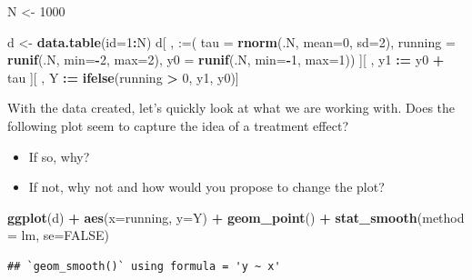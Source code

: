 \documentclass[
]{article}
\newenvironment{Shaded}{\begin{snugshade}}{\end{snugshade}}
\newcommand{\AttributeTok}[1]{\textcolor[rgb]{0.13,0.29,0.53}{#1}}
\newcommand{\ConstantTok}[1]{\textcolor[rgb]{0.56,0.35,0.01}{#1}}
\newcommand{\DecValTok}[1]{\textcolor[rgb]{0.00,0.00,0.81}{#1}}
\newcommand{\FunctionTok}[1]{\textcolor[rgb]{0.13,0.29,0.53}{\textbf{#1}}}
\newcommand{\NormalTok}[1]{#1}
\newcommand{\OtherTok}[1]{\textcolor[rgb]{0.56,0.35,0.01}{#1}}
\newcommand{\SpecialCharTok}[1]{\textcolor[rgb]{0.81,0.36,0.00}{\textbf{#1}}}
\newcommand{\StringTok}[1]{\textcolor[rgb]{0.31,0.60,0.02}{#1}}
\theoremstyle{definition}
\theoremstyle{definition}
\theoremstyle{definition}
\theoremstyle{definition}
\theoremstyle{remark}
\begin{document}
\begin{Shaded}
\begin{Highlighting}[]
\NormalTok{N }\OtherTok{\textless{}{-}} \DecValTok{1000}

\NormalTok{d }\OtherTok{\textless{}{-}} \FunctionTok{data.table}\NormalTok{(}\AttributeTok{id=}\DecValTok{1}\SpecialCharTok{:}\NormalTok{N)}
\NormalTok{d[ , }\StringTok{\textquotesingle{}:=\textquotesingle{}}\NormalTok{(}
  \AttributeTok{tau     =} \FunctionTok{rnorm}\NormalTok{(.N, }\AttributeTok{mean=}\DecValTok{0}\NormalTok{, }\AttributeTok{sd=}\DecValTok{2}\NormalTok{), }
  \AttributeTok{running =} \FunctionTok{runif}\NormalTok{(.N, }\AttributeTok{min=}\SpecialCharTok{{-}}\DecValTok{2}\NormalTok{, }\AttributeTok{max=}\DecValTok{2}\NormalTok{), }
  \AttributeTok{y0      =} \FunctionTok{runif}\NormalTok{(.N, }\AttributeTok{min=}\SpecialCharTok{{-}}\DecValTok{1}\NormalTok{, }\AttributeTok{max=}\DecValTok{1}\NormalTok{)) ][ , }
\NormalTok{  y1     }\SpecialCharTok{:=}\NormalTok{ y0 }\SpecialCharTok{+}\NormalTok{ tau ][ , }
\NormalTok{  Y      }\SpecialCharTok{:=} \FunctionTok{ifelse}\NormalTok{(running }\SpecialCharTok{\textgreater{}} \DecValTok{0}\NormalTok{, y1, y0)]}
\end{Highlighting}
\end{Shaded}

With the data created, let's quickly look at what we are working with. Does the following plot seem to capture the idea of a treatment effect?

\begin{itemize}
\item
  If so, why?
\item
  If not, why not and how would you propose to change the plot?
\end{itemize}

\begin{Shaded}
\begin{Highlighting}[]
\FunctionTok{ggplot}\NormalTok{(d) }\SpecialCharTok{+} 
  \FunctionTok{aes}\NormalTok{(}\AttributeTok{x=}\NormalTok{running, }\AttributeTok{y=}\NormalTok{Y) }\SpecialCharTok{+} 
  \FunctionTok{geom\_point}\NormalTok{() }\SpecialCharTok{+} 
  \FunctionTok{stat\_smooth}\NormalTok{(}\AttributeTok{method =} \StringTok{\textquotesingle{}lm\textquotesingle{}}\NormalTok{, }\AttributeTok{se=}\ConstantTok{FALSE}\NormalTok{)}
\end{Highlighting}
\end{Shaded}

\begin{verbatim}
## `geom_smooth()` using formula = 'y ~ x'
\end{verbatim}
\end{document}
